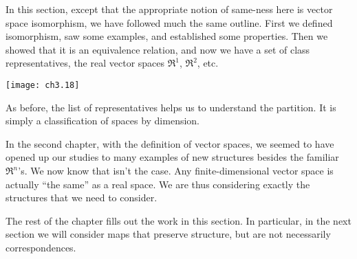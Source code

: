 In this section, except that the appropriate notion of same-ness 
here is vector space isomorphism, we have followed much the same outline.
First we defined isomorphism, saw some examples,
and established some properties.
Then we showed that it is an equivalence relation, and 
now we have a set of class representatives, 
the real vector spaces $\Re^1$, $\Re^2$, etc.
\begin{center}
  \texttt{[image: ch3.18]}
\end{center}
As before, the list of representatives helps us to understand the partition.
It is simply a classification of spaces by dimension.

In the second chapter,
with the definition of vector spaces, we seemed to have opened up our studies
to many examples of new structures besides the familiar $\Re^n$'s.
We now know that isn't the case.
Any finite-dimensional vector space is actually
``the same'' as a real space.
We are thus considering exactly the structures that we need to consider.

The rest of the chapter fills out
the work in this section.
In particular, in the next section we
will consider maps that preserve structure, but are not necessarily
correspondences.




